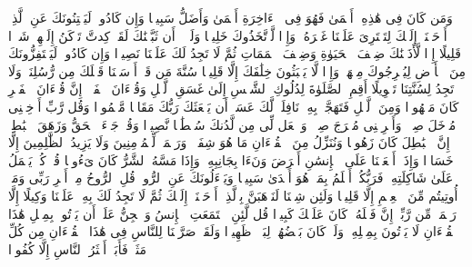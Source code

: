 \startbuffer[\q:17:72]
وَمَن كَانَ فِی هَٰذِهِۦۤ أَعۡمَىٰ فَهُوَ فِی ٱلۡءَاخِرَةِ أَعۡمَىٰ وَأَضَلُّ سَبِیلࣰا%
\stopbuffer
\startbuffer[\q:17:73]
وَإِن كَادُوا۟ لَیَفۡتِنُونَكَ عَنِ ٱلَّذِیۤ أَوۡحَیۡنَاۤ إِلَیۡكَ لِتَفۡتَرِیَ عَلَیۡنَا غَیۡرَهُۥۖ وَإِذࣰا لَّٱتَّخَذُوكَ خَلِیلࣰا%
\stopbuffer
\startbuffer[\q:17:74]
وَلَوۡلَاۤ أَن ثَبَّتۡنَٰكَ لَقَدۡ كِدتَّ تَرۡكَنُ إِلَیۡهِمۡ شَیۡءࣰا قَلِیلًا%
\stopbuffer
\startbuffer[\q:17:75]
إِذࣰا لَّأَذَقۡنَٰكَ ضِعۡفَ ٱلۡحَیَوٰةِ وَضِعۡفَ ٱلۡمَمَاتِ ثُمَّ لَا تَجِدُ لَكَ عَلَیۡنَا نَصِیرࣰا%
\stopbuffer
\startbuffer[\q:17:76]
وَإِن كَادُوا۟ لَیَسۡتَفِزُّونَكَ مِنَ ٱلۡأَرۡضِ لِیُخۡرِجُوكَ مِنۡهَاۖ وَإِذࣰا لَّا یَلۡبَثُونَ خِلَٰفَكَ إِلَّا قَلِیلࣰا%
\stopbuffer
\startbuffer[\q:17:77]
سُنَّةَ مَن قَدۡ أَرۡسَلۡنَا قَبۡلَكَ مِن رُّسُلِنَاۖ وَلَا تَجِدُ لِسُنَّتِنَا تَحۡوِیلًا%
\stopbuffer
\startbuffer[\q:17:78]
أَقِمِ ٱلصَّلَوٰةَ لِدُلُوكِ ٱلشَّمۡسِ إِلَىٰ غَسَقِ ٱلَّیۡلِ وَقُرۡءَانَ ٱلۡفَجۡرِۖ إِنَّ قُرۡءَانَ ٱلۡفَجۡرِ كَانَ مَشۡهُودࣰا%
\stopbuffer
\startbuffer[\q:17:79]
وَمِنَ ٱلَّیۡلِ فَتَهَجَّدۡ بِهِۦ نَافِلَةࣰ لَّكَ عَسَىٰۤ أَن یَبۡعَثَكَ رَبُّكَ مَقَامࣰا مَّحۡمُودࣰا%
\stopbuffer
\startbuffer[\q:17:80]
وَقُل رَّبِّ أَدۡخِلۡنِی مُدۡخَلَ صِدۡقࣲ وَأَخۡرِجۡنِی مُخۡرَجَ صِدۡقࣲ وَٱجۡعَل لِّی مِن لَّدُنكَ سُلۡطَٰنࣰا نَّصِیرࣰا%
\stopbuffer
\startbuffer[\q:17:81]
وَقُلۡ جَاۤءَ ٱلۡحَقُّ وَزَهَقَ ٱلۡبَٰطِلُۚ إِنَّ ٱلۡبَٰطِلَ كَانَ زَهُوقࣰا%
\stopbuffer
\startbuffer[\q:17:82]
وَنُنَزِّلُ مِنَ ٱلۡقُرۡءَانِ مَا هُوَ شِفَاۤءࣱ وَرَحۡمَةࣱ لِّلۡمُؤۡمِنِینَ وَلَا یَزِیدُ ٱلظَّٰلِمِینَ إِلَّا خَسَارࣰا%
\stopbuffer
\startbuffer[\q:17:83]
وَإِذَاۤ أَنۡعَمۡنَا عَلَى ٱلۡإِنسَٰنِ أَعۡرَضَ وَنَءَا بِجَانِبِهِۦ وَإِذَا مَسَّهُ ٱلشَّرُّ كَانَ یَءُوسࣰا%
\stopbuffer
\startbuffer[\q:17:84]
قُلۡ كُلࣱّ یَعۡمَلُ عَلَىٰ شَاكِلَتِهِۦ فَرَبُّكُمۡ أَعۡلَمُ بِمَنۡ هُوَ أَهۡدَىٰ سَبِیلࣰا%
\stopbuffer
\startbuffer[\q:17:85]
وَیَسۡءَلُونَكَ عَنِ ٱلرُّوحِۖ قُلِ ٱلرُّوحُ مِنۡ أَمۡرِ رَبِّی وَمَاۤ أُوتِیتُم مِّنَ ٱلۡعِلۡمِ إِلَّا قَلِیلࣰا%
\stopbuffer
\startbuffer[\q:17:86]
وَلَئِن شِئۡنَا لَنَذۡهَبَنَّ بِٱلَّذِیۤ أَوۡحَیۡنَاۤ إِلَیۡكَ ثُمَّ لَا تَجِدُ لَكَ بِهِۦ عَلَیۡنَا وَكِیلًا%
\stopbuffer
\startbuffer[\q:17:87]
إِلَّا رَحۡمَةࣰ مِّن رَّبِّكَۚ إِنَّ فَضۡلَهُۥ كَانَ عَلَیۡكَ كَبِیرࣰا%
\stopbuffer
\startbuffer[\q:17:88]
قُل لَّئِنِ ٱجۡتَمَعَتِ ٱلۡإِنسُ وَٱلۡجِنُّ عَلَىٰۤ أَن یَأۡتُوا۟ بِمِثۡلِ هَٰذَا ٱلۡقُرۡءَانِ لَا یَأۡتُونَ بِمِثۡلِهِۦ وَلَوۡ كَانَ بَعۡضُهُمۡ لِبَعۡضࣲ ظَهِیرࣰا%
\stopbuffer
\startbuffer[\q:17:89]
وَلَقَدۡ صَرَّفۡنَا لِلنَّاسِ فِی هَٰذَا ٱلۡقُرۡءَانِ مِن كُلِّ مَثَلࣲ فَأَبَىٰۤ أَكۡثَرُ ٱلنَّاسِ إِلَّا كُفُورࣰا%
\stopbuffer
\startbuffer[\q:17:90]
